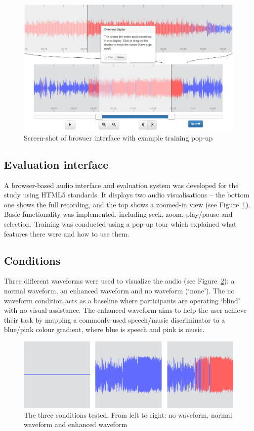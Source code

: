 \begin{figure}[!h]
\centering
\includegraphics[width=\columnwidth]{figs/interface.png}
\caption{Screen-shot of browser interface with example training pop-up}
\label{fig:iface}
\end{figure}

\subsection{Evaluation interface}
A browser-based audio interface and evaluation system was developed for the study using HTML5 standards. It displays
two audio visualisations -- the bottom one shows the full recording, and the top shows a zoomed-in view (see
Figure~\ref{fig:iface}).  Basic functionality was implemented, including seek, zoom, play/pause and selection. Training
was conducted using a pop-up tour which explained what features there were and how to use them.

\subsection{Conditions}
Three different waveforms were used to visualize the audio (see Figure~\ref{fig:conditions}): a normal waveform, an
enhanced waveform and no waveform (`none'). The no waveform condition acts as a baseline where participants are
operating `blind' with no visual assistance. The enhanced waveform aims to help the user achieve their task by mapping
a commonly-used speech/music discriminator to a blue/pink colour gradient, where blue is speech and pink is music.

\begin{figure}[!h]
\centering
\includegraphics[width=\columnwidth]{figs/conditions-horz.png}
\caption{The three conditions tested. From left to right: no waveform, normal
  waveform and enhanced waveform}
\label{fig:conditions}
\end{figure}

